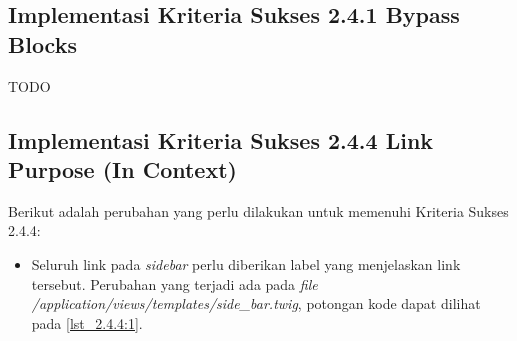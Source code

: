 \subsection{Implementasi Kriteria Sukses 2.4.1 Bypass Blocks}
\label{subsec:implementasi_A_2.4.1}
TODO

\subsection{Implementasi Kriteria Sukses 2.4.4 Link Purpose (In Context)}
\label{subsec:implementasi_A_2.4.4}

Berikut adalah perubahan yang perlu dilakukan untuk memenuhi Kriteria Sukses 2.4.4:

\begin{itemize}
	\item Seluruh link pada \textit{sidebar} perlu diberikan label yang menjelaskan link tersebut. Perubahan yang terjadi ada pada \textit{file} \textit{/application/views/templates/side\_bar.twig}, potongan kode dapat dilihat pada \ref{lst_2.4.4:1}.
	

\end{itemize}
